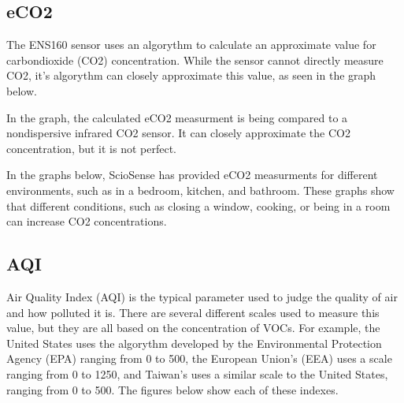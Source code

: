 \documentclass[letterpaper,10pt,english]{sphinxmanual}
\begin{document}
\subsection{eCO2}
\label{\detokenize{sensors/ens160:eco2}}
\sphinxAtStartPar
The ENS160 sensor uses an algorythm to calculate an approximate value for carbon\sphinxhyphen{}dioxide (CO2) concentration. While the sensor cannot directly measure CO2, it’s algorythm can closely approximate this value, as seen in the graph below.


\sphinxAtStartPar
In the graph, the calculated eCO2 measurment is being compared to a nondispersive infrared CO2 sensor. It can closely approximate the CO2 concentration, but it is not perfect.

\sphinxAtStartPar
In the graphs below, ScioSense has provided eCO2 measurments for different environments, such as in a bedroom, kitchen, and bathroom. These graphs show that different conditions, such as closing a window, cooking, or being in a room can increase CO2 concentrations.





\subsection{AQI}
\label{\detokenize{sensors/ens160:aqi}}
\sphinxAtStartPar
Air Quality Index (AQI) is the typical parameter used to judge the quality of air and how polluted it is. There are several different scales used to measure this value, but they are all based on the concentration of VOCs. For example, the United States uses the  algorythm developed by the Environmental Protection Agency (EPA) ranging from 0 to 500, the European Union’s  (EEA) uses a scale ranging from 0 to 1250, and Taiwan’s  uses a similar scale to the United States, ranging from 0 to 500. The figures below show each of these indexes.
\end{document}
